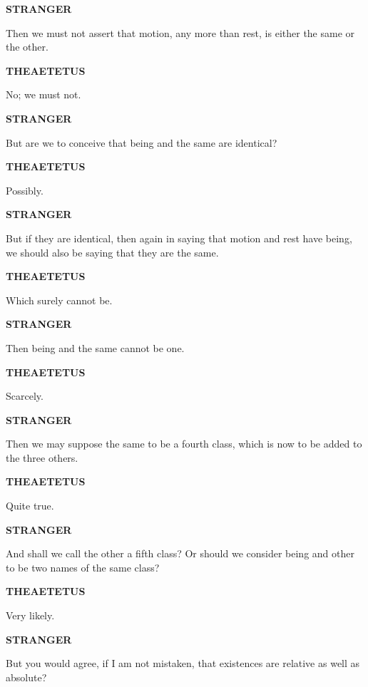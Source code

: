 \documentclass[11pt,letter]{article}
\begin{document}
\par \textbf{STRANGER}
\par   Then we must not assert that motion, any more than rest, is either the same or the other.

\par \textbf{THEAETETUS}
\par   No; we must not.

\par \textbf{STRANGER}
\par   But are we to conceive that being and the same are identical?

\par \textbf{THEAETETUS}
\par   Possibly.

\par \textbf{STRANGER}
\par   But if they are identical, then again in saying that motion and rest have being, we should also be saying that they are the same.

\par \textbf{THEAETETUS}
\par   Which surely cannot be.

\par \textbf{STRANGER}
\par   Then being and the same cannot be one.

\par \textbf{THEAETETUS}
\par   Scarcely.

\par \textbf{STRANGER}
\par   Then we may suppose the same to be a fourth class, which is now to be added to the three others.

\par \textbf{THEAETETUS}
\par   Quite true.

\par \textbf{STRANGER}
\par   And shall we call the other a fifth class? Or should we consider being and other to be two names of the same class?

\par \textbf{THEAETETUS}
\par   Very likely.

\par \textbf{STRANGER}
\par   But you would agree, if I am not mistaken, that existences are relative as well as absolute?
\end{document}
